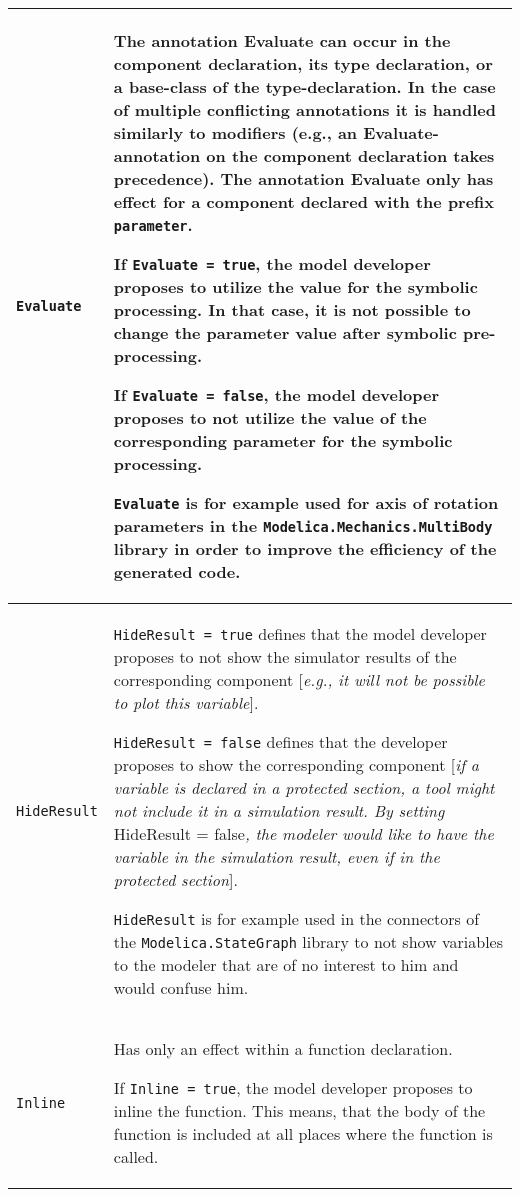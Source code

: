 \begin{longtable}[]{|p{4.2cm}|p{10cm}|}
\hline \endhead
\lstinline!Evaluate!&
The annotation Evaluate can occur in the component declaration, its type
declaration, or a base-class of the type-declaration. In the case of
multiple conflicting annotations it is handled similarly to modifiers
(e.g., an Evaluate-annotation on the component declaration takes
precedence). The annotation Evaluate only has effect for a component
declared with the prefix \lstinline!parameter!.

If \lstinline!Evaluate = true!, the model developer proposes to utilize the value
for the symbolic processing. In that case, it is not possible to change
the parameter value after symbolic pre-processing.

If \lstinline!Evaluate = false!, the model developer proposes to not utilize the
value of the corresponding parameter for the symbolic processing.

\begin{nonnormative}
\lstinline!Evaluate! is for example used for axis of rotation parameters in
the \lstinline!Modelica.Mechanics.MultiBody! library in order to improve the
efficiency of the generated code.
\end{nonnormative}
\\ \hline
\lstinline!HideResult! &
\lstinline!HideResult = true! defines that the model developer proposes to not show
the simulator results of the corresponding component {[}\emph{e.g., it
will not be possible to plot this variable}{]}.

\lstinline!HideResult = false! defines that the developer proposes to show the
corresponding component {[}\emph{if a variable is declared in a
protected section, a tool might not include it in a simulation result.
By setting} HideResult = false\emph{, the modeler would like to have the
variable in the simulation result, even if in the protected section}{]}.

\begin{nonnormative}
\lstinline!HideResult! is for example used in the connectors of the
\lstinline!Modelica.StateGraph! library to not show variables to the modeler
that are of no interest to him and would confuse him.
\end{nonnormative}
\\ \hline
\lstinline!Inline! &
Has only an effect within a function declaration.

If \lstinline!Inline = true!, the model developer proposes to inline the
function. This means, that the body of the function is included at all
places where the function is called.


\end{longtable}
